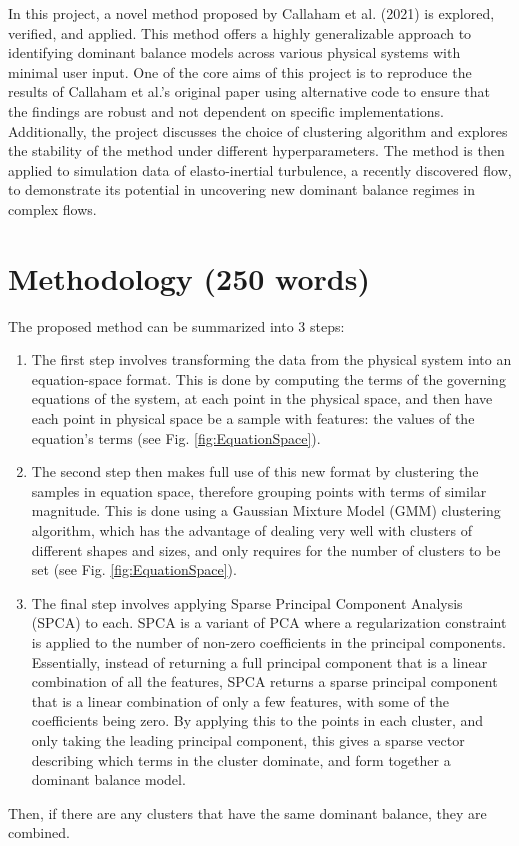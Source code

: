 \documentclass[12pt]{report} %
\begin{document}
\vspace{5mm}

In this project, a novel method proposed by Callaham et al. (2021)\cite{callaham2021learning} is explored, verified, and applied. This method offers a highly generalizable approach to identifying dominant balance models across various physical systems with minimal user input. One of the core aims of this project is to reproduce the results of Callaham et al.’s original paper using alternative code to ensure that the findings are robust and not dependent on specific implementations. Additionally, the project discusses the choice of clustering algorithm and explores the stability of the method under different hyperparameters. The method is then applied to simulation data of elasto-inertial turbulence\cite{Samanta2012eit}, a recently discovered flow, to demonstrate its potential in uncovering new dominant balance regimes in complex flows.


\section{Methodology (250 words)}

The proposed method can be summarized into 3 steps:
\begin{enumerate}
  \item The first step involves transforming the data from the physical system into an equation-space format. This is done by computing the terms of the governing equations of the system, at each point in the physical space, and then have each point in physical space be a sample with features: the values of the equation's terms (see Fig. \ref{fig:EquationSpace}).
  \item The second step then makes full use of this new format by clustering the samples in equation space, therefore grouping points with terms of similar magnitude. This is done using a Gaussian Mixture Model (GMM) clustering algorithm, which has the advantage of dealing very well with clusters of different shapes and sizes, and only requires for the number of clusters to be set (see Fig. \ref{fig:EquationSpace}).
  \item The final step involves applying Sparse Principal Component Analysis (SPCA) to each. SPCA is a variant of PCA where a regularization constraint is applied to the number of non-zero coefficients in the principal components. Essentially, instead of returning a full principal component that is a linear combination of all the features, SPCA returns a sparse principal component that is a linear combination of only a few features, with some of the coefficients being zero. By applying this to the points in each cluster, and only taking the leading principal component, this gives a sparse vector describing which terms in the cluster dominate, and form together a dominant balance model.
\end{enumerate}
Then, if there are any clusters that have the same dominant balance, they are combined.
\end{document}
